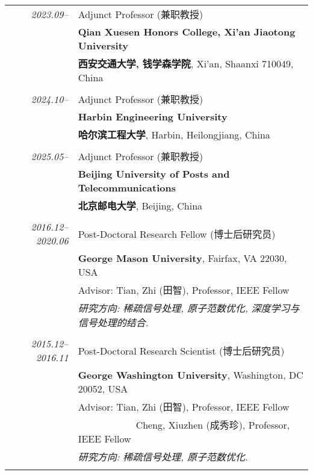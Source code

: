 \documentclass[paper=a4,fontsize=11pt]{scrartcl}
\begin{document}
\begin{longtable}{r|p{12cm}}
\emph{2023.09--} & Adjunct Professor (兼职教授)\\	
& \normalsize\textbf{Qian Xuesen Honors College, Xi'an Jiaotong University}\\
& \normalsize\textbf{西安交通大学, 钱学森学院}, Xi'an, Shaanxi 710049, China \\
\multicolumn{2}{c}{} \\

\emph{2024.10--} & Adjunct Professor (兼职教授)\\	
& \normalsize\textbf{Harbin Engineering University}\\
& \normalsize\textbf{哈尔滨工程大学}, Harbin, Heilongjiang, China \\
\multicolumn{2}{c}{} \\

\emph{2025.05--} & Adjunct Professor (兼职教授)\\	
& \normalsize\textbf{Beijing University of Posts and Telecommunications}\\
& \normalsize\textbf{北京邮电大学}, Beijing, China \\
\multicolumn{2}{c}{} \\

\emph{2016.12--2020.06} & Post-Doctoral Research Fellow (博士后研究员)\\
& \normalsize\textbf{George Mason University}, Fairfax, VA 22030, USA\\
& Advisor: Tian, Zhi (田智), Professor, IEEE Fellow \\
& \emph{研究方向: 稀疏信号处理, 原子范数优化, 深度学习与信号处理的结合.} \\
	\multicolumn{2}{c}{} \\


  \emph{2015.12--2016.11} & Post-Doctoral Research Scientist (博士后研究员)\\
  & \normalsize\textbf{George Washington University}, Washington, DC 20052, USA\\
  & Advisor: Tian, Zhi (田智), Professor, IEEE Fellow \\
  & ~~~~~~~~~~~~Cheng, Xiuzhen (成秀珍), Professor, IEEE Fellow \\
  & \emph{研究方向: 稀疏信号处理, 原子范数优化.}\\
  \multicolumn{2}{c}{} 


\end{longtable}
\end{document}
